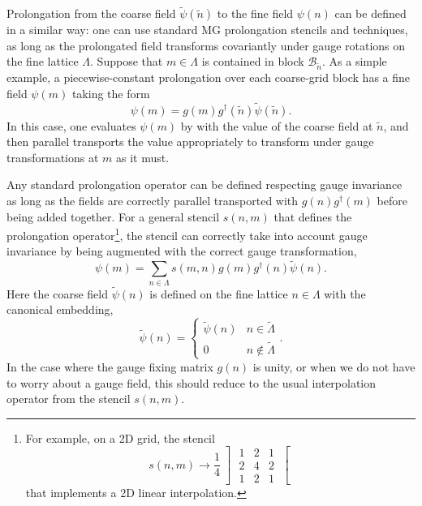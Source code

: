 \documentclass[letter,10pt]{report}
\begin{document}
Prolongation from the coarse field $\tilde{\psi}(\tilde{n})$ to the fine field $\psi(n)$ can be defined in a similar way: one can use standard MG prolongation stencils and techniques, as long as the prolongated field transforms covariantly under gauge rotations on the fine lattice $\Lambda$. Suppose that $m\in\Lambda$ is contained in block $\mathcal B_{\tilde{n}}$. As a simple example, a piecewise-constant prolongation over each coarse-grid block has a fine field $\psi(m)$ taking the form
\begin{equation}
	\psi(m) = g(m) g^\dagger(\tilde{n}) \tilde{\psi}(\tilde{n}).
\end{equation}
In this case, one evaluates $\psi(m)$ by with the value of the coarse field at $\tilde{n}$, and then parallel transports the value appropriately to transform under gauge transformations at $m$ as it must. 

Any standard prolongation operator can be defined respecting gauge invariance as long as the fields are correctly parallel transported with $g(n) g^\dagger(m)$ before being added together. For a general stencil $s(n, m)$ that defines the prolongation operator\footnote{For example, on a 2D grid, the stencil \begin{equation} s(n, m) \rightarrow \frac{1}{4} \left] \begin{matrix} 1 & 2 & 1 \\ 2 & 4 & 2 \\ 1 & 2 & 1 \end{matrix} \right[ \end{equation} that implements a 2D linear interpolation. }, the stencil can correctly take into account gauge invariance by being augmented with the correct gauge transformation,
\begin{equation}
	\psi(m) = \sum_{n\in\Lambda} s(m, n) g(m) g^\dagger(n) \tilde{\psi}(n).
\end{equation}
Here the coarse field $\tilde{\psi}(n)$ is defined on the fine lattice $n\in\Lambda$ with the canonical embedding,
\begin{equation}
	\tilde{\psi}(n) = \begin{cases} 
		\tilde{\psi}(n) & n\in\tilde{\Lambda} \\
		0 		    & n\notin \tilde{\Lambda} 
	\end{cases}.
\end{equation}
In the case where the gauge fixing matrix $g(n)$ is unity, or when we do not have to worry about a gauge field, this should reduce to the usual interpolation operator from the stencil $s(n, m)$. 
\end{document}
